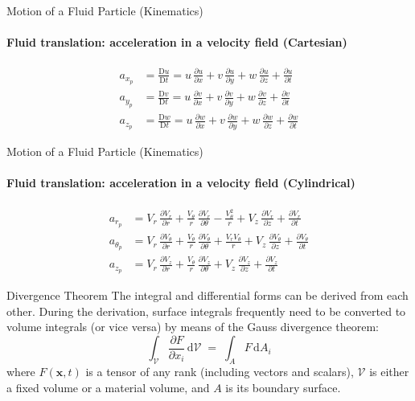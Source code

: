 \documentclass[10pt,aspectratio=43]{beamer}
\newcommand{\dd}{\mathrm{d}}
\newcommand{\D}{\mathrm{D}}
\newcommand{\pd}[2]{\frac{\partial #1}{\partial #2}}
\newcommand{\bx}{\mathbf{x}}
\newcommand{\Vol}{\mathcal{V}}
\begin{document}
\begin{frame}{Motion of a Fluid Particle (Kinematics)}
  \framesubtitle{Fluid translation: acceleration in a velocity field (Cartesian)}
  \begin{align*}
    a_{x_p} &= \frac{\D u}{\D t}
            = u\,\pd{u}{x} + v\,\pd{u}{y} + w\,\pd{u}{z} + \pd{u}{t} \\[2pt]
    a_{y_p} &= \frac{\D v}{\D t}
            = u\,\pd{v}{x} + v\,\pd{v}{y} + w\,\pd{v}{z} + \pd{v}{t} \\[2pt]
    a_{z_p} &= \frac{\D w}{\D t}
            = u\,\pd{w}{x} + v\,\pd{w}{y} + w\,\pd{w}{z} + \pd{w}{t}
  \end{align*}
\end{frame}

\begin{frame}{Motion of a Fluid Particle (Kinematics)}
  \framesubtitle{Fluid translation: acceleration in a velocity field (Cylindrical)}
  \begin{align*}
    a_{r_p}    &= V_{r}\,\pd{V_r}{r}
                  + \frac{V_\theta}{r}\,\pd{V_r}{\theta}
                  - \frac{V_\theta^{2}}{r}
                  + V_z\,\pd{V_r}{z}
                  + \pd{V_r}{t} \\[2pt]
    a_{\theta_p} &= V_{r}\,\pd{V_\theta}{r}
                  + \frac{V_\theta}{r}\,\pd{V_\theta}{\theta}
                  + \frac{V_r V_\theta}{r}
                  + V_z\,\pd{V_\theta}{z}
                  + \pd{V_\theta}{t} \\[2pt]
    a_{z_p}    &= V_{r}\,\pd{V_z}{r}
                  + \frac{V_\theta}{r}\,\pd{V_z}{\theta}
                  + V_z\,\pd{V_z}{z}
                  + \pd{V_z}{t}
  \end{align*}
\end{frame}

\begin{frame}{Divergence Theorem}
  The integral and differential forms can be derived from each other. During
  the derivation, surface integrals frequently need to be converted to
  volume integrals (or vice versa) by means of the Gauss divergence theorem:
  \[
    \int_{\Vol}\!\pd{F}{x_i}\,\dd\Vol \;=\; \int_{A}\! F\,\dd A_{i}
  \]
  where $F(\bx,t)$ is a tensor of any rank (including vectors and scalars),
  $\Vol$ is either a fixed volume or a material volume, and $A$ is its
  boundary surface.
\end{frame}
\end{document}
